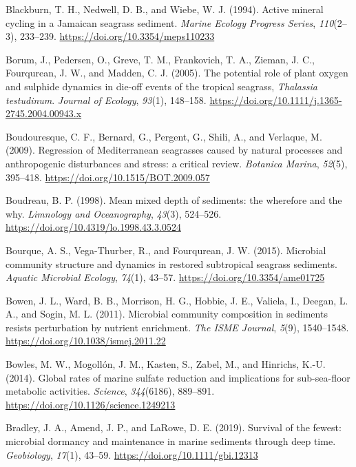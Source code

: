 \documentclass[
  12 pt,
]{book}
\newlength{\cslhangindent}
\newlength{\cslentryspacingunit} %
\newenvironment{CSLReferences}[2] %
 {%
  \setlength{\parindent}{0pt}
  \ifodd #1
  \let\oldpar\par
  \def\par{\hangindent=\cslhangindent\oldpar}
  \fi
  \setlength{\parskip}{#2\cslentryspacingunit}
 }%
 {}
\begin{document}
\begin{CSLReferences}{1}{0}
\leavevmode{}%
Blackburn, T. H., Nedwell, D. B., and Wiebe, W. J. (1994). Active mineral cycling in a {Jamaican} seagrass sediment. \emph{Marine Ecology Progress Series}, \emph{110}(2--3), 233--239. \url{https://doi.org/10.3354/meps110233}

\leavevmode{}%
Borum, J., Pedersen, O., Greve, T. M., Frankovich, T. A., Zieman, J. C., Fourqurean, J. W., and Madden, C. J. (2005). The potential role of plant oxygen and sulphide dynamics in die-off events of the tropical seagrass, {{\emph{Thalassia testudinum}}}. \emph{Journal of Ecology}, \emph{93}(1), 148--158. \url{https://doi.org/10.1111/j.1365-2745.2004.00943.x}

\leavevmode{}%
Boudouresque, C. F., Bernard, G., Pergent, G., Shili, A., and Verlaque, M. (2009). Regression of {Mediterranean} seagrasses caused by natural processes and anthropogenic disturbances and stress: a critical review. \emph{Botanica Marina}, \emph{52}(5), 395--418. \url{https://doi.org/10.1515/BOT.2009.057}

\leavevmode{}%
Boudreau, B. P. (1998). Mean mixed depth of sediments: the wherefore and the why. \emph{Limnology and Oceanography}, \emph{43}(3), 524--526. \url{https://doi.org/10.4319/lo.1998.43.3.0524}

\leavevmode{}%
Bourque, A. S., Vega-Thurber, R., and Fourqurean, J. W. (2015). Microbial community structure and dynamics in restored subtropical seagrass sediments. \emph{Aquatic Microbial Ecology}, \emph{74}(1), 43--57. \url{https://doi.org/10.3354/ame01725}

\leavevmode{}%
Bowen, J. L., Ward, B. B., Morrison, H. G., Hobbie, J. E., Valiela, I., Deegan, L. A., and Sogin, M. L. (2011). Microbial community composition in sediments resists perturbation by nutrient enrichment. \emph{The ISME Journal}, \emph{5}(9), 1540--1548. \url{https://doi.org/10.1038/ismej.2011.22}

\leavevmode{}%
Bowles, M. W., Mogollón, J. M., Kasten, S., Zabel, M., and Hinrichs, K.-U. (2014). Global rates of marine sulfate reduction and implications for sub-sea-floor metabolic activities. \emph{Science}, \emph{344}(6186), 889--891. \url{https://doi.org/10.1126/science.1249213}

\leavevmode{}%
Bradley, J. A., Amend, J. P., and LaRowe, D. E. (2019). Survival of the fewest: microbial dormancy and maintenance in marine sediments through deep time. \emph{Geobiology}, \emph{17}(1), 43--59. \url{https://doi.org/10.1111/gbi.12313}


\end{CSLReferences}
\end{document}
